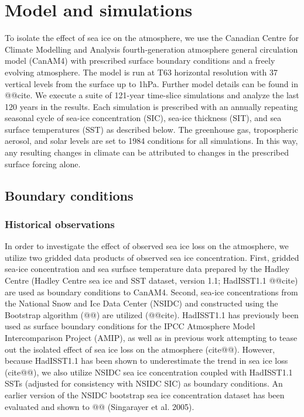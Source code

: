 \documentclass[twocol]{ametsoc}
\begin{document}
\section{Model and simulations}

To isolate the effect of sea ice on the atmosphere, we use the Canadian Centre for Climate Modelling and Analysis fourth-generation atmosphere general circulation model (CanAM4) with prescribed surface boundary conditions and a freely evolving atmosphere. The model is run at T63 horizontal resolution with 37 vertical levels from the surface up to 1hPa. Further model details can be found in @@cite. We execute a suite of 121-year time-slice simulations and analyze the last 120 years in the results. Each simulation is prescribed with an annually repeating seasonal cycle of sea-ice concentration (SIC), sea-ice thickness (SIT), and sea surface temperatures (SST) as described below. The greenhouse gas, tropospheric aerosol, and solar levels are set to 1984 conditions for all simulations. In this way, any resulting changes in climate can be attributed to changes in the prescribed surface forcing alone.

\subsection{Boundary conditions}
\subsubsection{Historical observations}

In order to investigate the effect of observed sea ice loss on the atmosphere, we utilize two gridded data products of observed sea ice concentration. First, gridded sea-ice concentration and sea surface temperature data prepared by the Hadley Centre (Hadley Centre sea ice and SST dataset, version 1.1; HadISST1.1 @@cite) are used as boundary conditions to CanAM4. Second, sea-ice concentrations from the National Snow and Ice Data Center (NSIDC) and constructed using the Bootstrap algorithm (@@) are utilized (@@cite). HadISST1.1 has previously been used as surface boundary conditions for the IPCC Atmosphere Model Intercomparison Project (AMIP), as well as in previous work attempting to tease out the isolated effect of sea ice loss on the atmosphere (cite@@). However, because HadISST1.1 has been shown to underestimate the trend in sea ice loss (cite@@), we also utilize NSIDC sea ice concentration coupled with HadISST1.1 SSTs (adjusted for consistency with NSIDC SIC) as boundary conditions. An earlier version of the NSIDC bootstrap sea ice concentration dataset has been evaluated and shown to @@ (Singarayer et al. 2005). 
\end{document}
